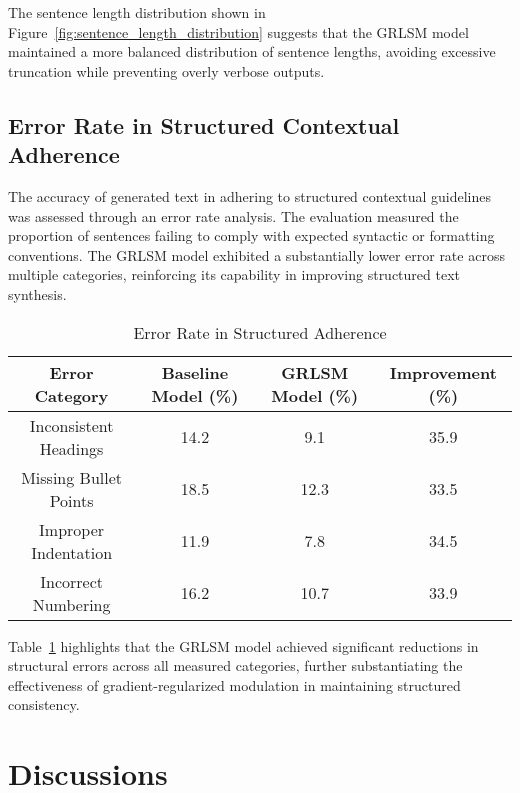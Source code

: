 \documentclass{article}
\begin{document}
The sentence length distribution shown in Figure~\ref{fig:sentence_length_distribution} suggests that the GRLSM model maintained a more balanced distribution of sentence lengths, avoiding excessive truncation while preventing overly verbose outputs.

\subsection{Error Rate in Structured Contextual Adherence}

The accuracy of generated text in adhering to structured contextual guidelines was assessed through an error rate analysis. The evaluation measured the proportion of sentences failing to comply with expected syntactic or formatting conventions. The GRLSM model exhibited a substantially lower error rate across multiple categories, reinforcing its capability in improving structured text synthesis.

\begin{table}[h]
	\centering
	\caption{Error Rate in Structured Adherence}
	\label{tab:structured_adherence}
	\begin{tabular}{|c|c|c|c|}
		\hline
		\textbf{Error Category} & \textbf{Baseline Model (\%)} & \textbf{GRLSM Model (\%)} & \textbf{Improvement (\%)} \\
		\hline
		Inconsistent Headings & 14.2 & 9.1 & 35.9 \\
		\hline
		Missing Bullet Points & 18.5 & 12.3 & 33.5 \\
		\hline
		Improper Indentation & 11.9 & 7.8 & 34.5 \\
		\hline
		Incorrect Numbering & 16.2 & 10.7 & 33.9 \\
		\hline
	\end{tabular}
\end{table}

Table~\ref{tab:structured_adherence} highlights that the GRLSM model achieved significant reductions in structural errors across all measured categories, further substantiating the effectiveness of gradient-regularized modulation in maintaining structured consistency.


\section{Discussions}
\end{document}

